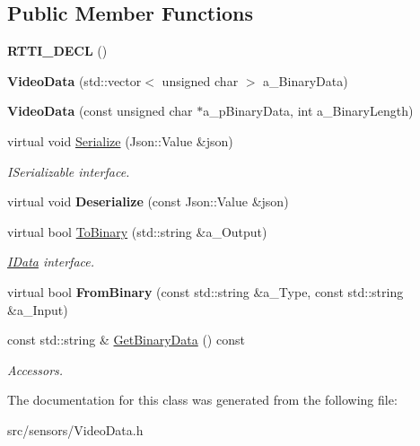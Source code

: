 \subsection*{Public Member Functions}
\begin{DoxyCompactItemize}
\item 
\mbox{\label{class_video_data_a0aeb16b6e48e44500e3fbd2d143deb03}} 
{\bfseries R\+T\+T\+I\+\_\+\+D\+E\+CL} ()
\item 
\mbox{\label{class_video_data_ad760e059a65bd0bc41751cddd04950b6}} 
{\bfseries Video\+Data} (std\+::vector$<$ unsigned char $>$ a\+\_\+\+Binary\+Data)
\item 
\mbox{\label{class_video_data_a4831527d72cad3b8d73af66c6535bd84}} 
{\bfseries Video\+Data} (const unsigned char $\ast$a\+\_\+p\+Binary\+Data, int a\+\_\+\+Binary\+Length)
\item 
\mbox{\label{class_video_data_a08c256bf08bd4f1699cb7e5516b1aa03}} 
virtual void \hyperlink{class_video_data_a08c256bf08bd4f1699cb7e5516b1aa03}{Serialize} (Json\+::\+Value \&json)
\begin{DoxyCompactList}\small\item\em I\+Serializable interface. \end{DoxyCompactList}\item 
\mbox{\label{class_video_data_a98b0a1f23b3db66ad08b857e61a32233}} 
virtual void {\bfseries Deserialize} (const Json\+::\+Value \&json)
\item 
\mbox{\label{class_video_data_a452a7f7290e463b02513ba4f1b08c3b7}} 
virtual bool \hyperlink{class_video_data_a452a7f7290e463b02513ba4f1b08c3b7}{To\+Binary} (std\+::string \&a\+\_\+\+Output)
\begin{DoxyCompactList}\small\item\em \hyperlink{class_i_data}{I\+Data} interface. \end{DoxyCompactList}\item 
\mbox{\label{class_video_data_a2a1aa21d689a6152bb2e6d1c7454912c}} 
virtual bool {\bfseries From\+Binary} (const std\+::string \&a\+\_\+\+Type, const std\+::string \&a\+\_\+\+Input)
\item 
\mbox{\label{class_video_data_a7c2f06d038f7688288ca25d4ade55d69}} 
const std\+::string \& \hyperlink{class_video_data_a7c2f06d038f7688288ca25d4ade55d69}{Get\+Binary\+Data} () const
\begin{DoxyCompactList}\small\item\em Accessors. \end{DoxyCompactList}\end{DoxyCompactItemize}


The documentation for this class was generated from the following file\+:\begin{DoxyCompactItemize}
\item 
src/sensors/Video\+Data.\+h\end{DoxyCompactItemize}
